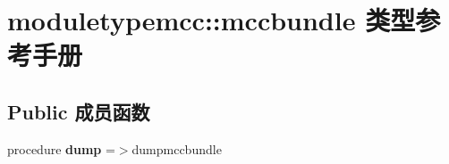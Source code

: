 \hypertarget{structmoduletypemcc_1_1mccbundle}{}\section{moduletypemcc\+::mccbundle 类型参考手册}
\label{structmoduletypemcc_1_1mccbundle}
\subsection*{Public 成员函数}
\begin{DoxyCompactItemize}
\item 
\mbox{\label{structmoduletypemcc_1_1mccbundle_ab0c4774a23d0c61aa1b2e1e8b60faf39}} 
procedure {\bfseries dump} =$>$dumpmccbundle
\end{DoxyCompactItemize}
